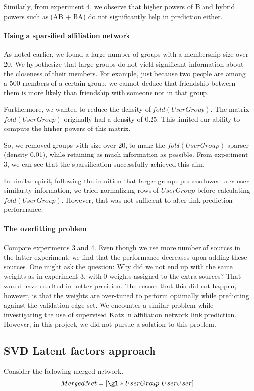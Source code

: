 \documentclass{report}
\begin{document}
Similarly, from experiment 4, we observe that higher powers of B and hybrid powers such as (AB + BA) do not significantly help in prediction either.

\paragraph*{Using a sparsified affiliation network}
As noted earlier, we found a large number of groups with a membership size over 20. We hypothesize that large groups do not yield significant information about the closeness of their members. For example, just because two people are among a 500 members of a certain group, we cannot deduce that friendship between them is more likely than friendship with someone not in that group.

Furthermore, we wanted to reduce the density of $fold(UserGroup)$. The matrix $fold(UserGroup)$ originally had a density of 0.25. This limited our ability to compute the higher powers of this matrix.

So, we removed groups with size over 20, to make the $fold(UserGroup)$ sparser (density 0.01), while retaining as much information as possible. From experiment 3, we can see that the sparsification successfully achieved this aim.

In similar spirit, following the intuition that larger groups possess lower user-user similarity information, we tried normalizing rows of $UserGroup$ before calculating $fold(UserGroup)$. However, that was not sufficient to alter link prediction performance.

\paragraph*{The overfitting problem}
Compare experiments 3 and 4. Even though we use more number of sources in the latter experiment, we find that the performance decreases upon adding these sources. One might ask the question: Why did we not end up with the same weights as in experiment 3, with 0 weights assigned to the extra sources? That would have resulted in better precision. The reason that this did not happen, however, is that the weights are over-tuned to perform optimally while predicting against the validation edge set. We encounter a similar problem while investigating the use of supervised Katz in affiliation network link prediction. However, in this project, we did not pursue a solution to this problem.

\subsection{SVD Latent factors approach}
Consider the following merged network.
$$MergedNet = [\gl * UserGroup\ UserUser]$$
\end{document}
